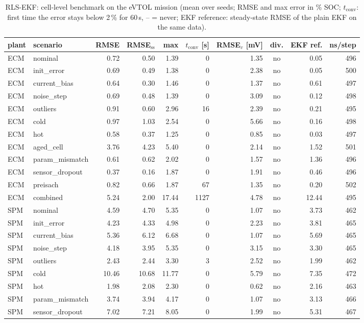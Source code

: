 \begin{table}[H]\centering\footnotesize\setlength{\tabcolsep}{4pt}
\caption{RLS-EKF: cell-level benchmark on the eVTOL mission (mean over seeds; RMSE and max error in \% SOC; $t_\mathrm{conv}$: first time the error stays below 2\,\% for 60\,s, -- = never; EKF reference: steady-state RMSE of the plain EKF on the same data).}\label{tab:cell_RLSEKF}
\begin{tabular}{llrrrrrcrr}\toprule
plant & scenario & RMSE & RMSE$_\mathrm{ss}$ & max & $t_\mathrm{conv}$ [s] & RMSE$_v$ [mV] & div. & EKF ref. & ns/step \\ \midrule
ECM & nominal & 0.72 & 0.50 & 1.39 & 0 & 1.35 & no & 0.05 & 496 \\
ECM & init\_error & 0.69 & 0.49 & 1.38 & 0 & 2.38 & no & 0.05 & 500 \\
ECM & current\_bias & 0.64 & 0.30 & 1.46 & 0 & 1.37 & no & 0.61 & 497 \\
ECM & noise\_step & 0.69 & 0.48 & 1.39 & 0 & 3.09 & no & 0.12 & 498 \\
ECM & outliers & 0.91 & 0.60 & 2.96 & 16 & 2.39 & no & 0.21 & 495 \\
ECM & cold & 0.97 & 1.03 & 2.54 & 0 & 5.66 & no & 0.16 & 498 \\
ECM & hot & 0.58 & 0.37 & 1.25 & 0 & 0.85 & no & 0.03 & 497 \\
ECM & aged\_cell & 3.76 & 4.23 & 5.40 & 0 & 2.14 & no & 1.52 & 501 \\
ECM & param\_mismatch & 0.61 & 0.62 & 2.02 & 0 & 1.57 & no & 1.36 & 496 \\
ECM & sensor\_dropout & 0.37 & 0.16 & 1.87 & 0 & 1.91 & no & 0.46 & 496 \\
ECM & preisach & 0.82 & 0.66 & 1.87 & 67 & 1.35 & no & 0.20 & 502 \\
ECM & combined & 5.24 & 2.00 & 17.44 & 1127 & 4.78 & no & 12.44 & 495 \\
\midrule
SPM & nominal & 4.59 & 4.70 & 5.35 & 0 & 1.07 & no & 3.73 & 462 \\
SPM & init\_error & 4.23 & 4.33 & 4.98 & 0 & 2.23 & no & 3.81 & 465 \\
SPM & current\_bias & 5.36 & 6.12 & 6.68 & 0 & 1.07 & no & 5.69 & 465 \\
SPM & noise\_step & 4.18 & 3.95 & 5.35 & 0 & 3.15 & no & 3.30 & 465 \\
SPM & outliers & 2.43 & 2.44 & 3.30 & 3 & 2.52 & no & 1.99 & 462 \\
SPM & cold & 10.46 & 10.68 & 11.77 & 0 & 5.79 & no & 7.35 & 472 \\
SPM & hot & 1.98 & 2.08 & 2.30 & 0 & 0.62 & no & 2.16 & 463 \\
SPM & param\_mismatch & 3.74 & 3.94 & 4.17 & 0 & 1.07 & no & 3.13 & 466 \\
SPM & sensor\_dropout & 7.02 & 7.21 & 8.05 & 0 & 1.99 & no & 5.31 & 467 \\
\bottomrule\end{tabular}\end{table}

